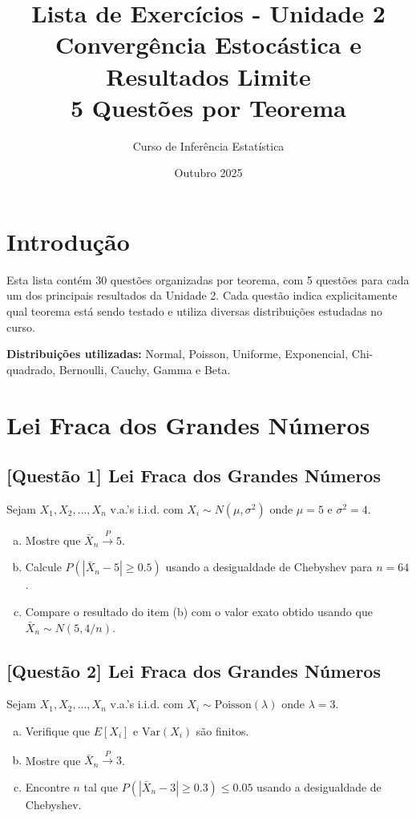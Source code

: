 \documentclass[12pt,a4paper]{article}
\title{Lista de Exercícios - Unidade 2\\
\large Convergência Estocástica e Resultados Limite\\
\normalsize 5 Questões por Teorema}
\author{Curso de Inferência Estatística}
\date{Outubro 2025}
\begin{document}
\maketitle
\tableofcontents
\newpage

\section{Introdução}

Esta lista contém 30 questões organizadas por teorema, com 5 questões para cada um dos principais resultados da Unidade 2. Cada questão indica explicitamente qual teorema está sendo testado e utiliza diversas distribuições estudadas no curso.

\textbf{Distribuições utilizadas:} Normal, Poisson, Uniforme, Exponencial, Chi-quadrado, Bernoulli, Cauchy, Gamma e Beta.

\section{Lei Fraca dos Grandes Números}

\subsection*{[Questão 1] Lei Fraca dos Grandes Números}

Sejam $X_1, X_2, \ldots, X_n$ v.a.'s i.i.d. com $X_i \sim N(\mu, \sigma^2)$ onde $\mu = 5$ e $\sigma^2 = 4$.

\begin{enumerate}[(a)]
    \item Mostre que $\bar{X}_n \xrightarrow{P} 5$.
    \item Calcule $P(|\bar{X}_n - 5| \geq 0.5)$ usando a desigualdade de Chebyshev para $n = 64$.
    \item Compare o resultado do item (b) com o valor exato obtido usando que $\bar{X}_n \sim N(5, 4/n)$.
\end{enumerate}

\subsection*{[Questão 2] Lei Fraca dos Grandes Números}

Sejam $X_1, X_2, \ldots, X_n$ v.a.'s i.i.d. com $X_i \sim \text{Poisson}(\lambda)$ onde $\lambda = 3$.

\begin{enumerate}[(a)]
    \item Verifique que $E[X_i]$ e $\text{Var}(X_i)$ são finitos.
    \item Mostre que $\bar{X}_n \xrightarrow{P} 3$.
    \item Encontre $n$ tal que $P(|\bar{X}_n - 3| \geq 0.3) \leq 0.05$ usando a desigualdade de Chebyshev.
\end{enumerate}
\end{document}

